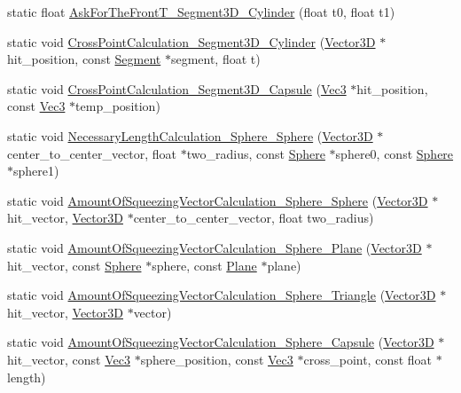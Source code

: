 \begin{DoxyCompactItemize}
\item 
static float \mbox{\hyperlink{class_collision_judgment_a413d713064c810f1bea6760e76db5221}{Ask\+For\+The\+Front\+T\+\_\+\+Segment3\+D\+\_\+\+Cylinder}} (float t0, float t1)
\item 
static void \mbox{\hyperlink{class_collision_judgment_ad369f21f29dfe28a337d10d8a9a06874}{Cross\+Point\+Calculation\+\_\+\+Segment3\+D\+\_\+\+Cylinder}} (\mbox{\hyperlink{class_vector3_d}{Vector3D}} $\ast$hit\+\_\+position, const \mbox{\hyperlink{class_segment}{Segment}} $\ast$segment, float t)
\item 
static void \mbox{\hyperlink{class_collision_judgment_a9d7bd7435d9e116c8d0dfb62662e60d5}{Cross\+Point\+Calculation\+\_\+\+Segment3\+D\+\_\+\+Capsule}} (\mbox{\hyperlink{_vector3_d_8h_ab16f59e4393f29a01ec8b9bbbabbe65d}{Vec3}} $\ast$hit\+\_\+position, const \mbox{\hyperlink{_vector3_d_8h_ab16f59e4393f29a01ec8b9bbbabbe65d}{Vec3}} $\ast$temp\+\_\+position)
\item 
static void \mbox{\hyperlink{class_collision_judgment_a987df18ee059d409ebb64ea67c6e2777}{Necessary\+Length\+Calculation\+\_\+\+Sphere\+\_\+\+Sphere}} (\mbox{\hyperlink{class_vector3_d}{Vector3D}} $\ast$center\+\_\+to\+\_\+center\+\_\+vector, float $\ast$two\+\_\+radius, const \mbox{\hyperlink{class_sphere}{Sphere}} $\ast$sphere0, const \mbox{\hyperlink{class_sphere}{Sphere}} $\ast$sphere1)
\item 
static void \mbox{\hyperlink{class_collision_judgment_aeb97af19dd3282bb85eb342c315a1ac3}{Amount\+Of\+Squeezing\+Vector\+Calculation\+\_\+\+Sphere\+\_\+\+Sphere}} (\mbox{\hyperlink{class_vector3_d}{Vector3D}} $\ast$hit\+\_\+vector, \mbox{\hyperlink{class_vector3_d}{Vector3D}} $\ast$center\+\_\+to\+\_\+center\+\_\+vector, float two\+\_\+radius)
\item 
static void \mbox{\hyperlink{class_collision_judgment_a6d5a391e5cc4bdafff98d04c219f9087}{Amount\+Of\+Squeezing\+Vector\+Calculation\+\_\+\+Sphere\+\_\+\+Plane}} (\mbox{\hyperlink{class_vector3_d}{Vector3D}} $\ast$hit\+\_\+vector, const \mbox{\hyperlink{class_sphere}{Sphere}} $\ast$sphere, const \mbox{\hyperlink{class_plane}{Plane}} $\ast$plane)
\item 
static void \mbox{\hyperlink{class_collision_judgment_a9b00e793394f46bdc74e6efa434c0255}{Amount\+Of\+Squeezing\+Vector\+Calculation\+\_\+\+Sphere\+\_\+\+Triangle}} (\mbox{\hyperlink{class_vector3_d}{Vector3D}} $\ast$hit\+\_\+vector, \mbox{\hyperlink{class_vector3_d}{Vector3D}} $\ast$vector)
\item 
static void \mbox{\hyperlink{class_collision_judgment_ae992df185735a5348aef01754ebf9b80}{Amount\+Of\+Squeezing\+Vector\+Calculation\+\_\+\+Sphere\+\_\+\+Capsule}} (\mbox{\hyperlink{class_vector3_d}{Vector3D}} $\ast$hit\+\_\+vector, const \mbox{\hyperlink{_vector3_d_8h_ab16f59e4393f29a01ec8b9bbbabbe65d}{Vec3}} $\ast$sphere\+\_\+position, const \mbox{\hyperlink{_vector3_d_8h_ab16f59e4393f29a01ec8b9bbbabbe65d}{Vec3}} $\ast$cross\+\_\+point, const float $\ast$length)

\end{DoxyCompactItemize}
